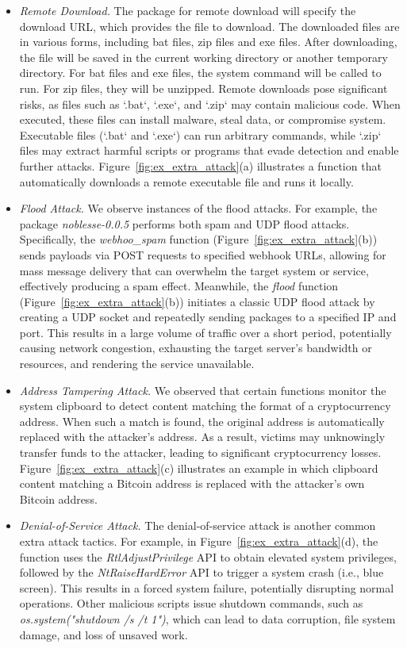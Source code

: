 \begin{itemize}
    \item \textit{Remote Download.} The package for remote download will specify the download URL, which provides the file to download. The downloaded files are in various forms, including bat files, zip files and exe files. After downloading, the file will be saved in the current working directory or another temporary directory. For bat files and exe files, the system command will be called to run. For zip files, they will be unzipped. Remote downloads pose significant risks, as files such as `.bat`, `.exe`, and `.zip` may contain malicious code. When executed, these files can install malware, steal data, or compromise system. Executable files (`.bat` and `.exe`) can run arbitrary commands, while `.zip` files may extract harmful scripts or programs that evade detection and enable further attacks. Figure~\ref{fig:ex_extra_attack}(a) illustrates a function that automatically downloads a remote executable file and runs it locally.

    \item \textit{Flood Attack.} We observe instances of the flood attacks. For example, the package \textit{noblesse-0.0.5} performs both spam and UDP flood attacks. Specifically, the \textit{webhoo\_spam} function (Figure~\ref{fig:ex_extra_attack}(b)) sends payloads via POST requests to specified webhook URLs, allowing for mass message delivery that can overwhelm the target system or service, effectively producing a spam effect. Meanwhile, the \textit{flood} function ({Figure~\ref{fig:ex_extra_attack}(b)}) initiates a classic UDP flood attack by creating a UDP socket and repeatedly sending packages to a specified IP and port. This results in a large volume of traffic over a short period, potentially causing network congestion, exhausting the target server's bandwidth or resources, and rendering the service unavailable.
    
    \item \textit{Address Tampering Attack.} We observed that certain functions monitor the system clipboard to detect content matching the format of a cryptocurrency address. When such a match is found, the original address is automatically replaced with the attacker's address. As a result, victims may unknowingly transfer funds to the attacker, leading to significant cryptocurrency losses. Figure~\ref{fig:ex_extra_attack}(c) illustrates an example in which clipboard content matching a Bitcoin address is replaced with the attacker's own Bitcoin address.

    
    \item \textit{Denial-of-Service Attack.} The denial-of-service attack is another common extra attack tactics. For example, in Figure~\ref{fig:ex_extra_attack}(d), the function uses the \textit{RtlAdjustPrivilege} API to obtain elevated system privileges, followed by the \textit{NtRaiseHardError} API to trigger a system crash (i.e., blue screen). This results in a forced system failure, potentially disrupting normal operations. Other malicious scripts issue shutdown commands, such as \textit{os.system("shutdown /s /t 1")}, which can lead to data corruption, file system damage, and loss of unsaved work.
\end{itemize}

